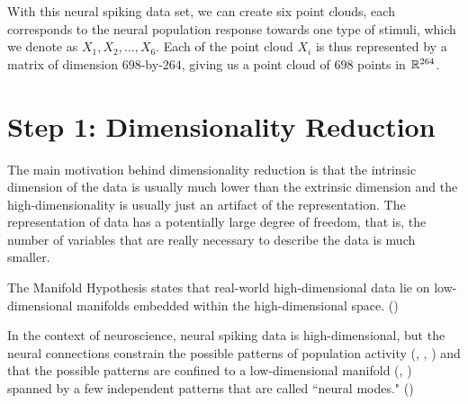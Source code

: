 With this neural spiking data set, we can create six point clouds, each corresponds to the neural population response towards one type of stimuli, which we denote as $X_1, X_2, \dots,X_6$. Each of the point cloud $X_i$ is thus represented by a matrix of dimension $698$-by-$264$, giving us a point cloud of $698$ points in $\mathbb R^{264}$. 

\section{Step 1: Dimensionality Reduction}

The main motivation behind dimensionality reduction is that the intrinsic dimension of the data is usually much lower than the extrinsic dimension and the high-dimensionality is usually just an artifact of the representation. The representation of data has a potentially large degree of freedom, that is, the number of variables that are really necessary to describe the data is much smaller.

The Manifold Hypothesis states that real-world high-dimensional data lie on low-dimensional manifolds embedded within the high-dimensional space. (\cite{deepai_2019})

In the context of neuroscience, neural spiking data is high-dimensional, but the neural connections constrain the possible patterns of population activity (\cite{okun_diverse_2015}, \cite{sadtler_neural_2014}, \cite{tsodyks_attractor_1999}) and that the possible patterns are confined to a low-dimensional manifold (\cite{stopfer_intensity_2003},  \cite{yu_gaussian-process_2009}) spanned by a few independent patterns that are called ``neural modes." (\cite{gallego_neural_2017})

